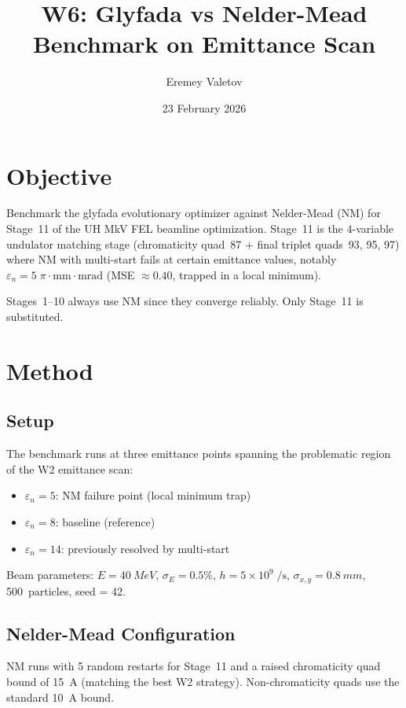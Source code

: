 \documentclass[11pt]{article}
\title{W6: Glyfada vs Nelder-Mead Benchmark on Emittance Scan}
\author{Eremey Valetov}
\date{23 February 2026}
\begin{document}
\maketitle

\section{Objective}

Benchmark the glyfada evolutionary optimizer against Nelder-Mead (NM) for
Stage~11 of the UH MkV FEL beamline optimization. Stage~11 is the
4-variable undulator matching stage (chromaticity quad~87 + final triplet
quads~93, 95, 97) where NM with multi-start fails at certain emittance
values, notably $\varepsilon_n = 5\;\pi\cdot\text{mm}\cdot\text{mrad}$
(MSE $\approx 0.40$, trapped in a local minimum).

Stages~1--10 always use NM since they converge reliably. Only Stage~11
is substituted.


\section{Method}

\subsection{Setup}

The benchmark runs at three emittance points spanning the problematic
region of the W2 emittance scan:
\begin{itemize}
  \item $\varepsilon_n = 5$: NM failure point (local minimum trap)
  \item $\varepsilon_n = 8$: baseline (reference)
  \item $\varepsilon_n = 14$: previously resolved by multi-start
\end{itemize}

\noindent Beam parameters: $E = \SI{40}{MeV}$, $\sigma_E = 0.5\%$,
$h = 5 \times 10^9\;\text{/s}$, $\sigma_{x,y} = \SI{0.8}{mm}$,
500~particles, seed = 42.

\subsection{Nelder-Mead Configuration}

NM runs with 5 random restarts for Stage~11 and a raised chromaticity
quad bound of \SI{15}{A} (matching the best W2 strategy). Non-chromaticity
quads use the standard \SI{10}{A} bound.
\end{document}
